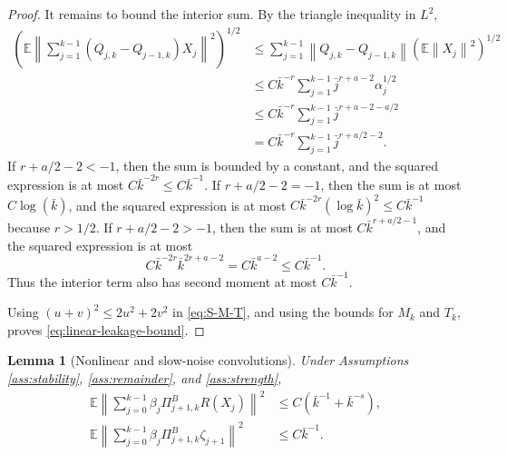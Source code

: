 \documentclass{article}
\newtheorem{lemma}[theorem]{Lemma}
\newcommand{\E}{\mathbb{E}}
\newcommand{\norm}[1]{\left\lVert #1\right\rVert}
\begin{document}
\begin{proof}
It remains to bound the interior sum. By the triangle inequality in $L^2$,
\[
\begin{aligned}
  \left(\E\left\|\sum_{j=1}^{k-1}(Q_{j,k}-Q_{j-1,k})X_j\right\|^2\right)^{1/2}
  &\le \sum_{j=1}^{k-1}\norm{Q_{j,k}-Q_{j-1,k}}\left(\E\norm{X_j}^2\right)^{1/2}\\
  &\le C\bar k^{-r}\sum_{j=1}^{k-1}\bar j^{r+a-2}\alpha_j^{1/2}\\
  &\le C\bar k^{-r}\sum_{j=1}^{k-1}\bar j^{r+a-2-a/2}\\
  &=C\bar k^{-r}\sum_{j=1}^{k-1}\bar j^{r+a/2-2}.
\end{aligned}
\]
If $r+a/2-2<-1$, then the sum is bounded by a constant, and the squared expression is at most $C\bar k^{-2r}\le C\bar k^{-1}$. If $r+a/2-2=-1$, then the sum is at most $C\log(\bar k)$, and the squared expression is at most $C\bar k^{-2r}(\log \bar k)^2\le C\bar k^{-1}$ because $r>1/2$. If $r+a/2-2>-1$, then the sum is at most $C\bar k^{r+a/2-1}$, and the squared expression is at most
\[
  C\bar k^{-2r}\bar k^{2r+a-2}=C\bar k^{a-2}\le C\bar k^{-1}.
\]
Thus the interior term also has second moment at most $C\bar k^{-1}$.

Using $(u+v)^2\le2u^2+2v^2$ in \eqref{eq:S-M-T}, and using the bounds for $M_k$ and $T_k$, proves \eqref{eq:linear-leakage-bound}.
\end{proof}

\begin{lemma}[Nonlinear and slow-noise convolutions]\label{lem:nonlinear-slow-noise}
Under Assumptions \ref{ass:stability}, \ref{ass:remainder}, and \ref{ass:strength},
\begin{align}
  \E\left\|\sum_{j=0}^{k-1}\beta_j\Pi^B_{j+1,k}R(X_j)\right\|^2
  &\le C\left(\bar k^{-1}+\bar k^{-s}\right), \label{eq:R-bound}\\
  \E\left\|\sum_{j=0}^{k-1}\beta_j\Pi^B_{j+1,k}\zeta_{j+1}\right\|^2
  &\le C\bar k^{-1}. \label{eq:zeta-bound}
\end{align}
\end{lemma}
\end{document}
